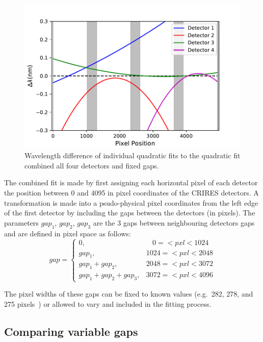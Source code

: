 \begin{figure}
    \includegraphics[width=0.75\linewidth]{./figures/appendix/difference_combined_wav_fit}
    \caption[Difference of multi-detector combined fit to the individual calibration mappings.]{Wavelength difference of individual quadratic fits to the quadratic fit combined all four detectors and fixed gaps.}
    \label{fig:multidectorfitdiff}
\end{figure}

The combined fit is made by first assigning each horizontal pixel of each detector the position between 0 and 4095 in pixel coordinates of the {CRIRES} detectors.
A transformation is made into a psudo-physical pixel coordinates from the left edge of the first detector by including the gaps between the detectors (in pixels).
The parameters \(gap_{1}\), \(gap_{2}\), \(gap_{3}\) are the 3 gaps between neighbouring detectors gaps and are defined in pixel space as follows:
\[
gap =\begin{cases}
0,                       & ~~~~0=<pxl<1024\\
gap_1,                    & 1024=<pxl<2048\\
gap_1 + gap_2,             & 2048=<pxl<3072\\
gap_1 + gap_2 + gap_3,      & 3072=<pxl<4096
\end{cases}
\]

The pixel widths of these gaps can be fixed to known values (e.g.\ 282, 278, and 275 pixels~\citep{brogi_rotation_2016}) or allowed to vary and included in the fitting process.


\subsection{Comparing variable gaps}

